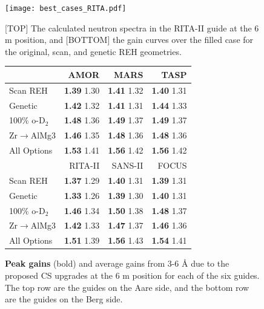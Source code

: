 \documentclass[a4paper]{jpconf}
\begin{document}
\begin{figure}[h!]
\CenterFloatBoxes
\begin{floatrow}
\ffigbox
  {\texttt{[image: best\_cases\_RITA.pdf]}}
  {\caption{ [TOP] The calculated neutron spectra in the RITA-II guide at the 6 m position, and [BOTTOM] the gain curves over the filled case for the original, scan, and genetic REH geometries.}\label{spec_rita}}
\killfloatstyle
\ttabbox
  {\begin{tabular}{| l | r | r | r |}
\hline
                      & AMOR              & MARS              & TASP        \\ 
 \hline
 Scan REH             & {\bf 1.39} 1.30   & {\bf 1.41} 1.32   & {\bf 1.40} 1.31   \\  
 \hline
 Genetic              & {\bf 1.42} 1.32   & {\bf 1.41} 1.31   & {\bf 1.44} 1.33   \\  
 \hline
 100\% o-D$_2$        & {\bf 1.48} 1.36   & {\bf 1.49} 1.37   & {\bf 1.49} 1.37   \\  
 \hline
 Zr$\rightarrow$AlMg3 & {\bf 1.46} 1.35   & {\bf 1.48} 1.36   & {\bf 1.48} 1.36   \\  
 \hline
 All Options          & {\bf 1.53} 1.41   & {\bf 1.56} 1.42   & {\bf 1.56} 1.42   \\    
 \hline
 \hline
                      & RITA-II           & SANS-II           & FOCUS       \\ 
 \hline
 Scan REH             & {\bf 1.37} 1.29   & {\bf 1.40} 1.31   & {\bf 1.39} 1.31   \\  
 \hline
 Genetic              & {\bf 1.33} 1.26   & {\bf 1.39} 1.30   & {\bf 1.40} 1.31   \\  
 \hline
 100\% o-D$_2$        & {\bf 1.46} 1.34   & {\bf 1.50} 1.38   & {\bf 1.48} 1.37   \\  
 \hline
 Zr$\rightarrow$AlMg3 & {\bf 1.42} 1.33   & {\bf 1.47} 1.37   & {\bf 1.46} 1.36   \\  
 \hline
 All Options          & {\bf 1.51} 1.39   & {\bf 1.56} 1.43   & {\bf 1.54} 1.41   \\  
 \hline
\end{tabular}
  }
  {\caption{{\bf Peak gains} (bold) and average gains from 3-6 {\AA} due to the proposed CS upgrades at the 6 m position for each of the six guides.  The top row are the guides on the Aare side, and the bottom row are the guides on the Berg side.}\label{tab:allguides}}
\end{floatrow}
\end{figure}
\end{document}
